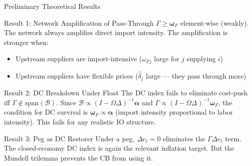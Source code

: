 \documentclass[aspectratio=169]{beamer}
\begin{document}
\begin{frame}{Preliminary Theoretical Results}

\begin{block}{Result 1: Network Amplification of Pass-Through}
$\Gamma \geq \bm{\omega}_F$ element-wise (weakly). The network always amplifies direct import intensity. The amplification is stronger when:
\begin{itemize}
    \item Upstream suppliers are import-intensive ($\omega_{Fj}$ large for $j$ supplying $i$)
    \item Upstream suppliers have flexible prices ($\hat{\delta}_j$ large --- they pass through more)
\end{itemize}
\end{block}

\begin{block}{Result 2: DC Breakdown Under Float}
The DC index fails to eliminate cost-push iff $\Gamma \not\in \mathrm{span}(\mathcal{B})$. Since $\mathcal{B} \propto (I-\Omega\Delta)^{-1}\bm{\alpha}$ and $\Gamma \propto (I-\Omega\Delta)^{-1}\bm{\omega}_F$, the condition for DC survival is $\bm{\omega}_F \propto \bm{\alpha}$ (import intensity proportional to labor intensity). This fails for any realistic IO structure.
\end{block}

\begin{block}{Result 3: Peg as DC Restorer}
Under a peg, $\Delta e_t = 0$ eliminates the $\Gamma\Delta e_t$ term. The closed-economy DC index is again the relevant inflation target. But the Mundell trilemma prevents the CB from using it.
\end{block}
\end{frame}
\end{document}
